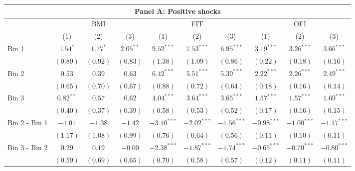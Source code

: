 \begin{tabular}{lccccccccc}

  \hline \multicolumn{10}{c}{Panel A: Positive shocks} \\

  \hline

  & \multicolumn{3}{c}{BMI} & \multicolumn{3}{c}{FIT} & \multicolumn{3}{c}{OFI} \\

  \cmidrule(lr){2-4} \cmidrule(lr){5-7} \cmidrule(lr){8-10}

  & (1) & (2) & (3) & (1) & (2) & (3) & (1) & (2) & (3) \\

  Bin 1 & $1.54^{*}$ & $1.77^{*}$ & $2.05^{**}$ & $9.52^{***}$ & $7.53^{***}$ & $6.95^{***}$ & $3.19^{***}$ & $3.26^{***}$ & $3.66^{***}$ \\

   & $(0.89)$ & $(0.92)$ & $(0.83)$ & $(1.38)$ & $(1.09)$ & $(0.86)$ & $(0.22)$ & $(0.18)$ & $(0.16)$ \\

  Bin 2 & $0.53$ & $0.39$ & $0.63$ & $6.42^{***}$ & $5.51^{***}$ & $5.39^{***}$ & $2.22^{***}$ & $2.26^{***}$ & $2.49^{***}$ \\

   & $(0.65)$ & $(0.70)$ & $(0.67)$ & $(0.88)$ & $(0.72)$ & $(0.64)$ & $(0.18)$ & $(0.16)$ & $(0.14)$ \\

  Bin 3 & $0.82^{**}$ & $0.57$ & $0.62$ & $4.04^{***}$ & $3.64^{***}$ & $3.65^{***}$ & $1.57^{***}$ & $1.57^{***}$ & $1.69^{***}$ \\

   & $(0.40)$ & $(0.37)$ & $(0.39)$ & $(0.58)$ & $(0.53)$ & $(0.52)$ & $(0.17)$ & $(0.16)$ & $(0.15)$ \\

  Bin 2 - Bin 1 & $-1.01$ & $-1.38$ & $-1.42$ & $-3.10^{***}$ & $-2.02^{***}$ & $-1.56^{***}$ & $-0.98^{***}$ & $-1.00^{***}$ & $-1.17^{***}$ \\

   & $(1.17)$ & $(1.08)$ & $(0.99)$ & $(0.76)$ & $(0.64)$ & $(0.56)$ & $(0.11)$ & $(0.10)$ & $(0.11)$ \\

  Bin 3 - Bin 2 & $0.29$ & $0.19$ & $-0.00$ & $-2.38^{***}$ & $-1.87^{***}$ & $-1.74^{***}$ & $-0.65^{***}$ & $-0.70^{***}$ & $-0.80^{***}$ \\

   & $(0.59)$ & $(0.69)$ & $(0.65)$ & $(0.70)$ & $(0.58)$ & $(0.57)$ & $(0.12)$ & $(0.11)$ & $(0.11)$ \\


\end{tabular}

